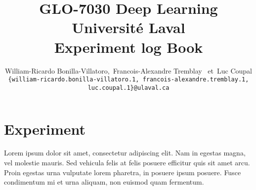 \documentclass[10pt]{report} %
\title{
\textbf{GLO-7030 Deep Learning}\\
\vspace{1em}
Université Laval\\
\vspace{1em}
\huge Experiment log Book
\propositionVersion{1.0}
\vspace{2em}
}
\author{%
    \large
    William-Ricardo Bonilla-Villatoro,\,
    Francois-Alexandre Tremblay
    \,
    \textnormal{et}\, Luc Coupal \\
    {\footnotesize \texttt{\{william-ricardo.bonilla-villatoro.1, francois-alexandre.tremblay.1, luc.coupal.1\}@ulaval.ca}} \\
}
\begin{document}
    \maketitle
    \tableofcontents
    \newpage

    \section{Experiment}
    Lorem ipsum dolor sit amet, consectetur adipiscing elit. Nam in egestas magna, vel molestie mauris. Sed vehicula felis at felis posuere efficitur quis sit amet arcu. Proin egestas urna vulputate lorem pharetra, in posuere ipsum posuere. Fusce condimentum mi et urna aliquam, non euismod quam fermentum.
\end{document}
